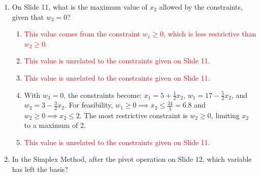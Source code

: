 \documentclass{article}%
\newcommand{\incorrect}[1]{\textcolor{red}{#1}}
\begin{document}
\begin{enumerate}
\begin{enumerate}%
\item \incorrect{The constraint $w_1 \ge 0$ gives $12 + x_1 \ge 0$, which implies $x_1 \ge -12$. This is not a limiting constraint.}%
\item \incorrect{The constraint $w_2 \ge 0$ gives $8 - x_1 \ge 0$, which implies $x_1 \le 8$. This is less restrictive than $w_3 \ge 0$.}%
\item The constraints are $w_1 = 12 + x_1 - 3x_2$, $w_2 = 8 - x_1 - x_2$, and $w_3 = 10 - 2x_1 + x_2$.  Since $x_2 = 0$, we have $w_2 = 8 - x_1$ and $w_3 = 10 - 2x_1$.  For feasibility, $w_2 \ge 0 \implies x_1 \le 8$ and $w_3 \ge 0 \implies x_1 \le 5$. The most restrictive constraint is $w_3 \ge 0$, limiting $x_1$ to a maximum of 5.%
\item \incorrect{The constraint $x_1 \ge 0$ is a non-negativity constraint and does not determine the maximum feasible value of $x_1$ in this context.}%
\item \incorrect{The constraint $x_2 \ge 0$ is given as a condition ($x_2 = 0$) and does not determine the maximum feasible value of $x_1$.}%
\end{enumerate}%
\vspace{1em}%
\item On Slide 11, what is the maximum value of $x_2$ allowed by the constraints, given that $w_3 = 0$?%
\begin{enumerate}%
\item \incorrect{This value comes from the constraint $w_1 \ge 0$, which is less restrictive than $w_2 \ge 0$.}%
\item \incorrect{This value is unrelated to the constraints given on Slide 11.}%
\item \incorrect{This value is unrelated to the constraints given on Slide 11.}%
\item With $w_3 = 0$, the constraints become: $x_1 = 5 + \frac{1}{2}x_2$, $w_1 = 17 - \frac{5}{2}x_2$, and $w_2 = 3 - \frac{3}{2}x_2$.  For feasibility, $w_1 \ge 0 \implies x_2 \le \frac{34}{5} = 6.8$ and $w_2 \ge 0 \implies x_2 \le 2$. The most restrictive constraint is $w_2 \ge 0$, limiting $x_2$ to a maximum of 2.%
\item \incorrect{This value is unrelated to the constraints given on Slide 11.}%
\end{enumerate}%
\vspace{1em}%
\item In the Simplex Method, after the pivot operation on Slide 12, which variable has left the basis?%

\end{enumerate}
\end{document}
